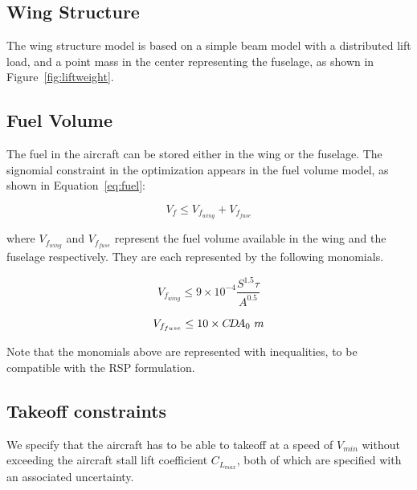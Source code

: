 \subsection{Wing Structure}
The wing structure model is based on a simple beam model with a distributed lift load,
and a point mass in the center representing the fuselage, as shown in Figure~\ref{fig:liftweight}.

\subsection{Fuel Volume}
The fuel in the aircraft can be stored either in the wing or the fuselage.
The signomial constraint in the optimization appears in the fuel volume model, as shown in Equation~\ref{eq:fuel}:

\begin{equation}
\label{eq:fuel}
V_f \leq V_{f_{wing}} + V_{f_{fuse}} 
\end{equation}

where $V_{f_{wing}}$ and $V_{f_{fuse}}$ represent the fuel volume available in the wing
and the fuselage respectively. They are each represented by the following monomials.

\begin{equation}
\label{eq:fuelwing}
V_{f_{wing}} \leq 9 \times 10^{-4} \frac{S^{1.5}\tau}{A^{0.5}}
\end{equation}

\begin{equation}
\label{eq:fuelfuse}
V_{f_{fuse}} \leq 10 \times C\!D\!A_0~m
\end{equation}

Note that the monomials above are represented with inequalities, to be compatible with the RSP formulation. 

\subsection{Takeoff constraints}
We specify that the aircraft has to be able to takeoff at a speed of $V_{min}$
without exceeding the aircraft stall lift coefficient $C_{L_{max}}$, both of which are
specified with an associated uncertainty.
